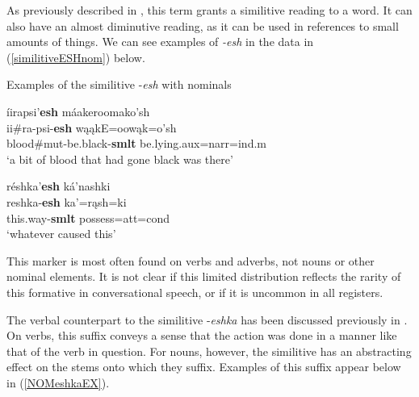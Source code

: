 \label{suffixsimilitive1redux}

As previously described in , this term grants a similitive reading to a word. It can also have an almost diminutive reading, as it can be used in references to small amounts of things. We can see examples of \textit{-esh} in the data in (\ref{similitiveESHnom}) below.

\newpage

\begin{exe}

\item\label{similitiveESHnom} Examples of the similitive -\textit{esh} with nominals 


\begin{xlist}
	\item \glll íirapsi'\textbf{esh} máakeroomako'sh\\
	ii\#ra-psi-\textbf{esh} wąąkE=oowąk=o'sh\\
	\textnormal{blood}\#mut-\textnormal{be.black}-\textbf{smlt} \textnormal{be.lying}.aux=narr=ind.m\\
	\glt `a bit of blood that had gone black was there' \citep[132]{hollow1973a}
	
	\item \glll réshka'\textbf{esh} ká'nashki\\
	reshka-\textbf{esh} ka'=rąsh=ki\\
	\textnormal{this.way}-\textbf{smlt} \textnormal{possess}=att=cond\\
	\glt `whatever caused this' \citep[182]{trechter2012}

\end{xlist}

\end{exe}

This marker is most often found on verbs and adverbs, not nouns or other nominal elements. It is not clear if this limited distribution reflects the rarity of this formative in conversational speech, or if it is uncommon in all registers.

\label{suffixsimilitive2redux}

The verbal counterpart to the similitive -\textit{eshka} has been discussed previously in . On verbs, this suffix conveys a sense that the action was done in a manner like that of the verb in question. For nouns, however, the similitive has an abstracting effect on the stems onto which they suffix. Examples of this suffix appear below in (\ref{NOMeshkaEX}).

